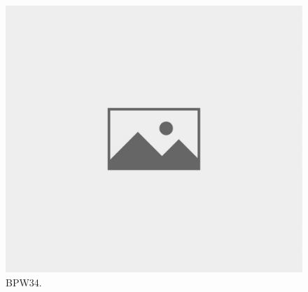 \begin{figure}[H]
 \centering
 \includegraphics[scale=0.35, angle = 0]{./pictures/NoPicture.jpg}
 \caption{BPW34.}
 \label{BPW34}
 
\end{figure}

